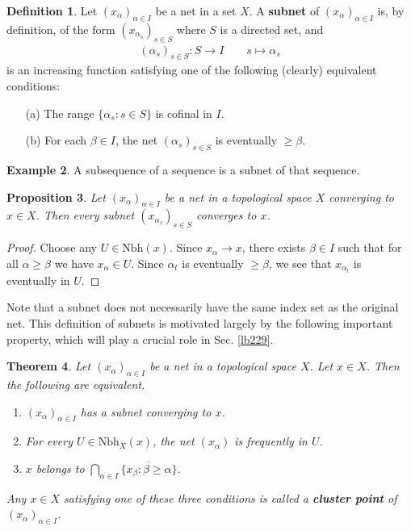 \documentclass[12pt,b5paper,notitlepage]{article}
\theoremstyle{definition}
\newtheorem{df}{Definition}[subsection]
\newtheorem{eg}[df]{Example}
\theoremstyle{plain}
\newtheorem{thm}[df]{Theorem}
\newtheorem{pp}[df]{Proposition}
\newcommand{\ovl}{\overline}
\newcommand{\dps}{\displaystyle}
\newcommand{\Nbh}{\mathrm{Nbh}}
\numberwithin{equation}{section}
\begin{document}
\begin{df}
Let $(x_\alpha)_{\alpha\in I}$ be a net in a set $X$. A \textbf{subnet}  of $(x_\alpha)_{\alpha\in I}$ is, by definition, of the form $(x_{\alpha_s})_{s\in S}$ where $S$ is a directed set, and
\begin{align*}
(\alpha_s)_{s\in S}:S\rightarrow I\qquad s\mapsto \alpha_s
\end{align*}
is an increasing function satisfying one of the following (clearly) equivalent conditions:
\begin{enumerate}
\item[(a)] The range $\{\alpha_s:s\in S\}$ is cofinal in $I$.
\item[(b)] For each $\beta\in I$, the net $(\alpha_s)_{s\in S}$ is eventually $\geq\beta$.
\end{enumerate}
\end{df}


\begin{eg}
A subsequence of a sequence is a subnet of that sequence.
\end{eg}


\begin{pp}\label{lb236}
Let $(x_\alpha)_{\alpha\in I}$ be a net in a topological space $X$ converging to $x\in X$. Then every subnet $(x_{\alpha_s})_{s\in S}$ converges to $x$.
\end{pp}

\begin{proof}
Choose any $U\in\Nbh(x)$. Since $x_\alpha\rightarrow x$, there exists $\beta\in I$ such that for all $\alpha\geq\beta$ we have $x_\alpha\in U$. Since $\alpha_t$ is eventually $\geq\beta$, we see that $x_{\alpha_t}$ is eventually in $U$.
\end{proof}


Note that a subnet does not necessarily have the same index set as the original net. This definition of subnets is motivated largely by the following important property, which will play a crucial role in Sec. \ref{lb229}.

\begin{thm}\label{lb213}
Let $(x_\alpha)_{\alpha\in I}$ be a net in a topological space $X$. Let $x\in X$. Then the following are equivalent.
\begin{enumerate}[label=(\arabic*)]
\item $(x_\alpha)_{\alpha\in I}$ has a subnet converging to $x$.
\item For every $U\in\Nbh_X(x)$, the net $(x_\alpha)$ is frequently in $U$.
\item $x$ belongs to $\dps\bigcap_{\alpha\in I}\ovl{\{x_\beta:\beta\geq\alpha\}}$.
\end{enumerate}
Any $x\in X$ satisfying one of these three conditions is called a \textbf{cluster point}  of $(x_\alpha)_{\alpha\in I}$.
\end{thm}
\end{document}
